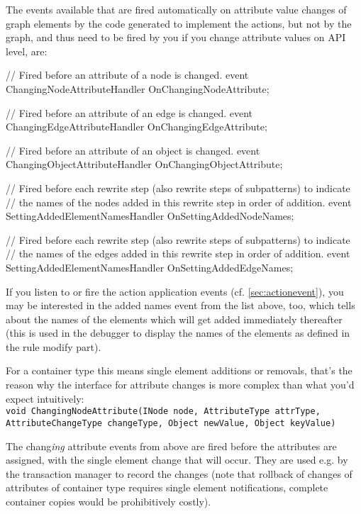 The events available that are fired automatically on attribute value changes of graph elements by the code generated to implement the actions, but not by the graph, and thus need to be fired by you if you change attribute values on API level, are:

\begin{csharplet}
// Fired before an attribute of a node is changed.
event ChangingNodeAttributeHandler OnChangingNodeAttribute;

// Fired before an attribute of an edge is changed.
event ChangingEdgeAttributeHandler OnChangingEdgeAttribute;

// Fired before an attribute of an object is changed.
event ChangingObjectAttributeHandler OnChangingObjectAttribute;

// Fired before each rewrite step (also rewrite steps of subpatterns) to indicate 
// the names of the nodes added in this rewrite step in order of addition.
event SettingAddedElementNamesHandler OnSettingAddedNodeNames;

// Fired before each rewrite step (also rewrite steps of subpatterns) to indicate 
// the names of the edges added in this rewrite step in order of addition.
event SettingAddedElementNamesHandler OnSettingAddedEdgeNames;
\end{csharplet}

If you listen to or fire the action application events (cf. \ref{sec:actionevent}), you may be interested in the added names event from the list above, too, which tells about the names of the elements which will get added immediately thereafter (this is used in the debugger to display the names of the elements as defined in the rule modify part).

For a container type this means single element additions or removals, that's the reason why the interface for attribute changes is more complex than what you'd expect intuitively:\\ 
\verb#void ChangingNodeAttribute(INode node, AttributeType attrType,#\\
\verb#AttributeChangeType changeType, Object newValue, Object keyValue)#

The chang\emph{ing} attribute events from above are fired before the attributes are assigned, with the single element change that will occur. 
They are used e.g. by the transaction manager to record the changes (note that rollback of changes of attributes of container type requires single element notifications, complete container copies would be prohibitively costly).

